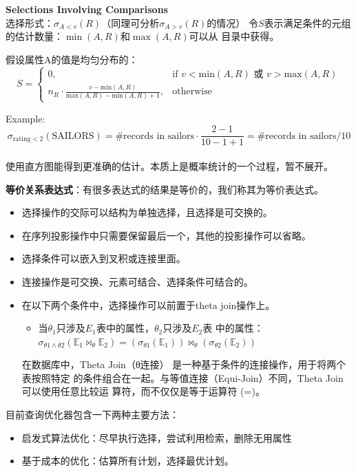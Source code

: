 \documentclass[b5paper, twoside]{article}
\let\oldtextbf\textbf
\renewcommand{\textbf}[1]{\textcolor{myblue}{\oldtextbf{#1}}}
\newenvironment{smallmdframed}
  {\begin{mdframed}[linewidth=0pt, backgroundcolor=pink!20]\small}
  {\end{mdframed}}
\begin{document}
\textbf{Selections Involving Comparisons}  
\\选择形式：$\sigma_{A<v}(R)$（同理可分析$\sigma_{A>v}(R)$的情况）  
令$ S $表示满足条件的元组的估计数量：$ \min(A,R) $和$ \max(A,R) $可以从
目录中获得。

假设属性A的值是均匀分布的：
\[
S =
\begin{cases}
	0, & \text{if } v < \text{min}(A,R) \text{ 或 } v > \text{max}(A,R) \\
	n_R \cdot \frac{v - \text{min}(A,R)}{\text{max}(A,R) - \text{min}(A,R) 
	+ 1}, & \text{otherwise}
\end{cases}
\]

{Example:}  
$$
\sigma_{\text{rating}<2}(\text{SAILORS}) = \text{\# records in sailors} \cdot 
\frac{2-1}{10-1+1}= \text{\# records in sailors} / 10
$$
\\使用{直方图}能得到更准确的估计。本质上是概率统计的一个过程，暂不展开。

\textbf{等价关系表达式}：有很多表达式的结果是等价的，我们称其为等价表达式。
\begin{itemize}
	\item 选择操作的交际可以结构为单独选择，且选择是可交换的。
	\item 在序列投影操作中只需要保留最后一个，其他的投影操作可以省略。
	\item 选择条件可以嵌入到叉积或连接里面。
	\item 连接操作是可交换、元素可结合、选择条件可结合的。
	\item 在以下两个条件中，选择操作可以前置于theta join操作上。
	\begin{itemize}
		\item 当$ \theta _1 $只涉及$ E_1 $表中的属性，$ \theta _2 $只涉及$ E_2 $表
		中的属性：\\
		$\sigma_{\theta1\wedge\theta2}(\mathbb{E}_1\Join_\theta\mathbb{E}_2)=(\sigma_{\theta1}(\mathbb{E}_1))\Join_\theta(\sigma_{\theta2}(\mathbb{E}_2))$
	\end{itemize}
	\begin{smallmdframed}
		在数据库中，Theta Join（θ连接） 是一种基于条件的连接操作，用于将两个表按照特定
		的条件组合在一起。与等值连接（Equi-Join）不同，Theta Join 可以使用任意比较运
		算符，而不仅仅是等于运算符 (=)。
	\end{smallmdframed}
\end{itemize}
目前查询优化器包含一下两种主要方法：
\begin{itemize}
	\item 启发式算法优化：尽早执行选择，尝试利用检索，删除无用属性
	\item 基于成本的优化：估算所有计划，选择最优计划。
\end{itemize}
\end{document}
